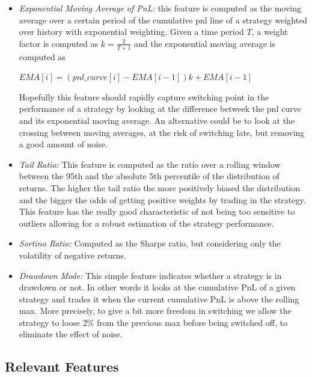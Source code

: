 \documentclass[a4paper]{article}
\numberwithin{equation}{subsection}
\begin{document}
\begin{itemize}
	\item \textit{Exponential Moving Average of PnL:} this feature is computed as the moving average over a certain period of the cumulative pnl line of a strategy weighted over history with exponential weighting. Given a time period $T$, a weight factor is computed as $k = \frac{2}{T+1}$ and the exponential moving average is computed as\\
	
	\begin{center} 
		$\displaystyle EMA[i] =  \left(pnl\_curve[i] - EMA[i-1]\right)k + EMA[i-1]$
	\end{center}
	
	Hopefully this feature should rapidly capture switching point in the performance of a strategy by looking at the difference betweek the pnl curve and its exponential moving average. An alternative could be to look at the crossing between moving averages, at the risk of switching late, but removing a good amount of noise.\\
	
	\item \textit{Tail Ratio:} This feature is computed as the ratio over a rolling window between the 95th and the absolute 5th percentile of the distribution of returns. The higher the tail ratio the more positively biased the distribution and the bigger the odds of getting positive weights by trading in the strategy. This feature has the really good characteristic of not being too sensitive to outliers allowing for a robust estimation of the strategy performance.\\
	
	\item \textit{Sortino Ratio:} Computed as the Sharpe ratio, but considering only the volatility of negative returns.\\ 
	
	\item \textit{Drawdown Mode:} This simple feature indicates whether a strategy is in drawdown or not. In other words it looks at the cumulative PnL of a given strategy and trades it when the current cumulative PnL is above the rolling max. More precisely, to give a bit more freedom in switching we allow the strategy to loose 2\% from the previous max before being switched off, to eliminate the effect of noise.\\
	 
\end{itemize}


\subsection*{Relevant Features}
\end{document}
